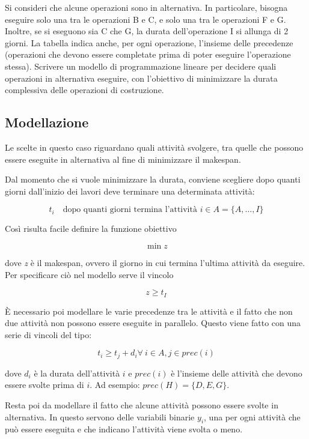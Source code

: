 Si consideri che alcune operazioni sono in alternativa. In particolare, bisogna eseguire solo una tra le operazioni B e C, e solo una tra le operazioni F e G. Inoltre, se si eseguono sia C che G, la durata dell'operazione I si allunga di 2 giorni.
La tabella indica anche, per ogni operazione, l'insieme delle precedenze (operazioni che devono essere completate prima di poter eseguire l'operazione stessa).
Scrivere un modello di programmazione lineare per decidere quali operazioni in alternativa eseguire, con l'obiettivo di minimizzare la durata complessiva delle operazioni di costruzione.

\subsection{Modellazione}

Le scelte in questo caso riguardano quali attività svolgere, tra quelle che possono essere eseguite in alternativa al fine di minimizzare il makespan.

Dal momento che si vuole minimizzare la durata, conviene scegliere dopo quanti giorni dall'inizio dei lavori deve terminare una determinata attività:

$$
t_i \quad \text{dopo quanti giorni termina l'attività }i \in A = \{A, \ldots, I \}
$$

\noindent Così risulta facile definire la funzione obiettivo

$$
\min z
$$

\noindent dove \textit{z} è il makespan, ovvero il giorno in cui termina l'ultima attività da eseguire. Per specificare ciò nel modello serve il vincolo

$$
z \geq t_I
$$

\noindent \`E necessario poi modellare le varie precedenze tra le attività e il fatto che non due attività non possono essere eseguite in parallelo.
Questo viene fatto con una serie di vincoli del tipo:

$$
t_i \geq t_{j} + d_{i} \forall \: i \in A, j \in prec(i)
$$

\noindent dove $d_i$ è la durata dell'attività $i$ e $prec(i)$ è l'insieme delle attività che devono essere svolte prima di $i$. Ad esempio: $prec(H) = \{D,E,G\}$.

Resta poi da modellare il fatto che alcune attività possono essere svolte in alternativa. In questo servono delle variabili binarie $y_i$, una per ogni attività che può essere eseguita e che indicano l'attività viene svolta o meno.


